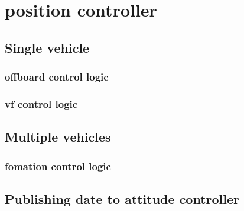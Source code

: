 \chapter{position controller}

\section{Single vehicle}
    \subsection{offboard control logic}

    \clearpage
    \subsection{vf control logic}
    
    \clearpage

\section{Multiple vehicles}
    \subsection{fomation control logic}

    \clearpage

\section{Publishing date to attitude controller}